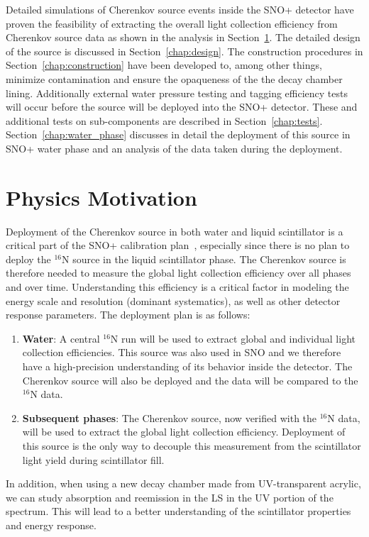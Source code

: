 Detailed simulations of Cherenkov source events inside the SNO+ detector have proven the feasibility of extracting the overall light collection efficiency from Cherenkov source data as shown in the analysis in Section~\ref{chap:motivation}. The detailed design of the source is discussed in Section~\ref{chap:design}. The construction procedures in Section~\ref{chap:construction} have been developed to, among other things, minimize contamination and ensure the opaqueness of the the decay chamber lining. Additionally external water pressure testing and tagging efficiency tests will occur before the source will be deployed into the SNO+ detector. These and additional tests on sub-components are described in Section~\ref{chap:tests}. Section~\ref{chap:water_phase} discusses in detail the deployment of this source in SNO+ water phase and an analysis of the data taken during the deployment.

\section{Physics Motivation}
\label{chap:motivation}
Deployment of the Cherenkov source in both water and liquid scintillator is a critical part of the SNO+ calibration plan~\cite{gann:2013}, especially since there is no plan to deploy the $^{16}$N source in the liquid scintillator phase. The Cherenkov source is therefore needed to measure the global light collection efficiency over all phases and over time. Understanding this efficiency is a critical factor in modeling the energy scale and resolution (dominant systematics), as well as other detector response parameters. The deployment plan is as follows: 
\begin{enumerate}
    \item {\bf Water}: A central $^{16}$N run will be used to extract global and individual light collection efficiencies. This source was also used in SNO and we therefore have a high-precision understanding of its behavior inside the detector. The Cherenkov source will also be deployed and the data will be compared to the $^{16}$N data.
    \item {\bf Subsequent phases}: The Cherenkov source, now verified with the $^{16}$N data, will be used to extract the global light collection efficiency. Deployment of this source is the only way to decouple this measurement from the scintillator light yield during scintillator fill.
\end{enumerate} 
In addition, when using a new decay chamber made from UV-transparent acrylic, we can study absorption and reemission in the LS in the UV portion of the spectrum. This will lead to a better understanding of the scintillator properties and energy response.


